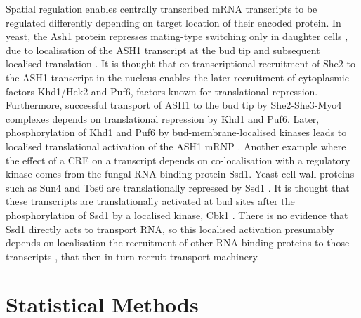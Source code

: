 \documentclass[../main.tex]{subfiles}
\begin{document}
Spatial regulation enables centrally transcribed mRNA transcripts to be regulated differently depending on target location of their encoded protein.
In yeast, the Ash1 protein represses mating-type switching only in daughter
cells \parencite{Sil1996}, due to localisation of the ASH1 transcript at the bud tip and subsequent localised translation \parencite{Niednery2014}. 
It is thought that co-transcriptional recruitment of She2 to the ASH1 transcript in the nucleus enables the later recruitment of cytoplasmic factors Khd1/Hek2 and Puf6, factors known for translational repression. 
Furthermore, successful transport of ASH1 to the bud tip by She2-She3-Myo4 complexes depends on translational repression by Khd1 and Puf6. 
Later, phosphorylation of Khd1 and Puf6 by bud-membrane-localised kinases leads to localised translational activation of the ASH1 mRNP \parencite{Paquin2007, Deng2008}.
Another example where the effect of a CRE on a transcript depends on co-localisation with a regulatory kinase comes from the fungal RNA-binding protein Ssd1. 
Yeast cell wall proteins such as Sun4 and Tos6 are translationally repressed by Ssd1 \parencite{Jansen2009}.
It is thought that these transcripts are translationally activated at bud sites after the phosphorylation of Ssd1 by a localised kinase, Cbk1 \parencite{Jansen2009}. 
There is no evidence that Ssd1 directly acts to transport RNA, so this localised activation presumably depends on localisation the recruitment of other RNA-binding proteins to those transcripts \parencite{Hogan2008, Bayne2021}, that then in turn recruit transport machinery.
\newpage

\section{Statistical Methods}
\end{document}
